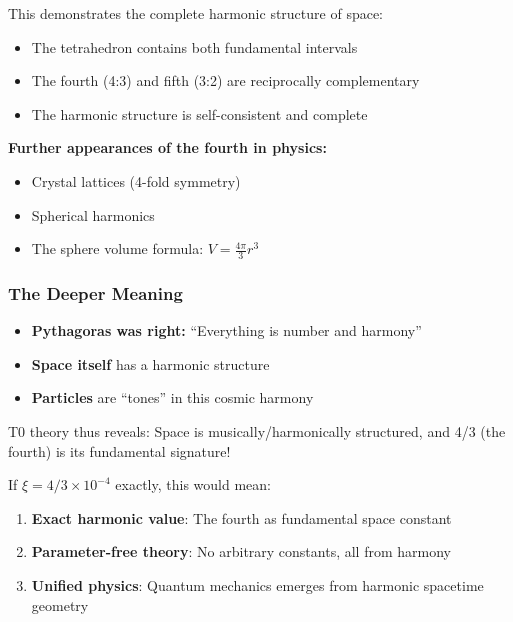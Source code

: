 \documentclass[12pt,a4paper]{article}
\newcommand{\xipar}{\ensuremath{\xi}}
\newcommand{\mypi}{\ensuremath{\pi}}
\newcommand{\mytimes}{\ensuremath{\times}}
\begin{document}
			This demonstrates the complete harmonic structure of space:
			\begin{itemize}
				\item The tetrahedron contains both fundamental intervals
				\item The fourth (4:3) and fifth (3:2) are reciprocally complementary
				\item The harmonic structure is self-consistent and complete
			\end{itemize}
			
			\textbf{Further appearances of the fourth in physics:}
			\begin{itemize}
				\item Crystal lattices (4-fold symmetry)
				\item Spherical harmonics
				\item The sphere volume formula: $V = \frac{4\mypi}{3}r^3$
			\end{itemize}
			
			\subsubsection{The Deeper Meaning}
			\label{subsubsec:deeper_meaning}
			
			\begin{tcolorbox}[colback=green!5!white,colframe=green!75!black,title=The Pythagorean Truth]
				\begin{itemize}
					\item \textbf{Pythagoras was right:} ``Everything is number and harmony''
					\item \textbf{Space itself} has a harmonic structure
					\item \textbf{Particles} are ``tones'' in this cosmic harmony
				\end{itemize}
			\end{tcolorbox}
			
			T0 theory thus reveals: Space is musically/harmonically structured, and 4/3 (the fourth) is its fundamental signature!
			
			If $\xipar = 4/3 \mytimes 10^{-4}$ exactly, this would mean:
			\begin{enumerate}
				\item \textbf{Exact harmonic value}: The fourth as fundamental space constant
				\item \textbf{Parameter-free theory}: No arbitrary constants, all from harmony
				\item \textbf{Unified physics}: Quantum mechanics emerges from harmonic spacetime geometry
			\end{enumerate}
			
\end{document}
